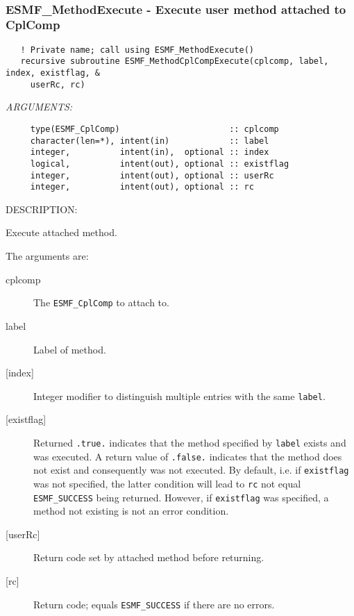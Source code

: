  
\mbox{}\hrulefill\ 
 
\subsubsection [ESMF\_MethodExecute] {ESMF\_MethodExecute - Execute user method attached to CplComp}


  
\begin{verbatim}   ! Private name; call using ESMF_MethodExecute()
   recursive subroutine ESMF_MethodCplCompExecute(cplcomp, label, index, existflag, &
     userRc, rc)\end{verbatim}{\em ARGUMENTS:}
\begin{verbatim}     type(ESMF_CplComp)                      :: cplcomp
     character(len=*), intent(in)            :: label
     integer,          intent(in),  optional :: index
     logical,          intent(out), optional :: existflag
     integer,          intent(out), optional :: userRc
     integer,          intent(out), optional :: rc\end{verbatim}
{\sf DESCRIPTION:\\ }


   Execute attached method.
  
   The arguments are:
   \begin{description}
   \item[cplcomp]
     The {\tt ESMF\_CplComp} to attach to.
   \item[label]
     Label of method.
   \item[{[index]}]
     Integer modifier to distinguish multiple entries with the same {\tt label}.
   \item[{[existflag]}]
     Returned {\tt .true.} indicates that the method specified by {\tt label}
     exists and was executed. A return value of {\tt .false.} indicates that
     the method does not exist and consequently was not executed. By default,
     i.e. if {\tt existflag} was not specified, the latter condition will lead
     to {\tt rc} not equal {\tt ESMF\_SUCCESS} being returned. However, if
     {\tt existflag} was specified, a method not existing is not an error
     condition.
   \item[{[userRc]}]
     Return code set by attached method before returning.
   \item[{[rc]}]
     Return code; equals {\tt ESMF\_SUCCESS} if there are no errors.
   \end{description}
   
